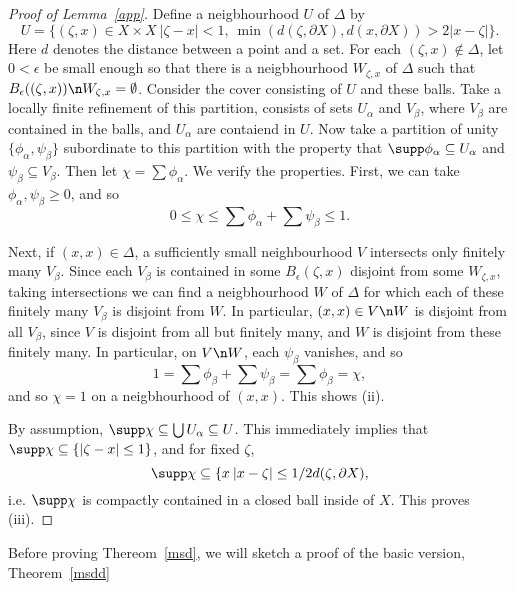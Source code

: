\documentclass[12pt]{article}
\begin{document}
\begin{proof}[Proof of Lemma~\ref{app}]
Define a neigbhourhood $U$ of $\Delta$ by
\[U = \{(\zeta,x) \in X\times X\: |\zeta-x| < 1, \ \min (d(\zeta,\partial X),d(x,\partial X)) > 2|x-\zeta|\}.\]
Here $d$ denotes the distance between a  point and a set. For each $(\zeta,x) \not \in \Delta$, let $0 < \epsilon$ be small enough so that there is a neigbhourhood $W_{\zeta,x}$ of $\Delta$ such that $B_{\epsilon}((\zeta,x))\n W_{\zeta,x} = \emptyset$. Consider the cover consisting of $U$ and these balls. Take a locally finite refinement of this partition, consists of sets $U_\alpha$ and $V_\beta$, where $V_\beta$ are contained in the balls, and $U_\alpha$ are contaiend in $U$. Now take a partition of unity $\{\phi_\alpha,\psi_\beta\}$ subordinate to this partition with the property that $\supp \phi_\alpha \subseteq U_\alpha$ and $\psi_\beta \subseteq V_\beta$. Then let $\chi = \sum \phi_\alpha$. We verify the properties. First, we can take $\phi_\alpha,\psi_\beta \geq 0$, and so 
\[0 \leq \chi \leq \sum \phi_\alpha + \sum \psi_\beta \leq 1.\]
 
Next, if $(x,x) \in \Delta$, a sufficiently small neighbourhood $V$ intersects only finitely many $V_\beta$. Since each $V_\beta$ is contained in some $B_{\epsilon}(\zeta,x)$ disjoint from some $W_{\zeta,x}$, taking intersections we can find a neigbhourhood $W$ of $\Delta$ for which each of these finitely many $V_\beta$ is disjoint from $W$. In particular, $(x,x) \in V\n W$ is disjoint from all $V_\beta$, since $V$ is disjoint from all but finitely many, and $W$ is disjoint from these finitely many. In particular, on $V\n W$, each $\psi_\beta$ vanishes, and so
 \[1 = \sum \phi_\beta + \sum \psi_\beta = \sum \phi_\beta = \chi,\]
 and so $\chi = 1$ on a neigbhourhood of $(x,x)$. This shows (ii).
 
By assumption, $\supp \chi \subseteq \bigcup U_\alpha \subseteq U$. This immediately implies that $\supp \chi \subseteq \{|\zeta-x| \leq 1\}$, and for fixed $\zeta$,
\[\supp \chi \subseteq \{x\: |x-\zeta| \leq 1/2d(\zeta,\partial X),\]
i.e. $\supp \chi$ is compactly contained in a closed ball inside of $X$. This proves (iii).
\end{proof}

Before proving Thereom~\ref{msd}, we will sketch a proof of the basic version, Theorem~\ref{msdd}
\end{document}
